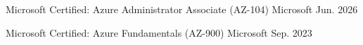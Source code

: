 

\begin{cvhonors}

  \cvhonor
    {Microsoft Certified: Azure Administrator Associate (AZ-104)} %
    {Microsoft} %
    {} %
    {Jun. 2026} %

  \cvhonor
    {Microsoft Certified: Azure Fundamentals (AZ-900)} %
    {Microsoft} %
    {} %
    {Sep. 2023} %

\end{cvhonors}

